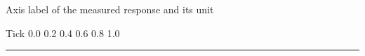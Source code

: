 \documentclass[border=1pt]{standalone}
\begin{document}
\begin{minipage}{170pt}
\fontsize{5}{6}\selectfont
Axis label of the measured response and its unit\par
Tick 0.0 0.2 0.4 0.6 0.8 1.0\par
\rule{170pt}{40pt}
\end{minipage}
\end{document}
